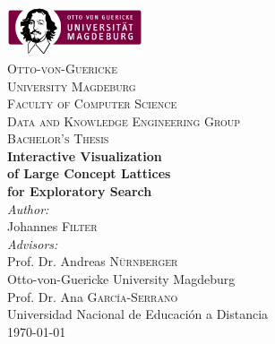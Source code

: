 \begin{titlepage}

\newcommand{\HRule}{\rule{\linewidth}{0.5mm}} %

\center %
 
\includegraphics[width=0.3\textwidth]{./images/logo}\\[0.3cm]

\textsc{\LARGE Otto-von-Guericke}\\[0.2cm] 
\textsc{\LARGE University Magdeburg}\\[0.3cm] 

\textsc{\large Faculty of Computer Science}\\[0.3cm]

\textsc{\normalsize Data and Knowledge Engineering Group}\\[1.5cm]

\textsc{\Large Bachelor's Thesis}\\[1.5cm] %

{ \huge \bfseries Interactive Visualization}\\[0.35cm]
{ \huge \bfseries of Large Concept Lattices}\\[0.2cm]
{ \huge \bfseries for Exploratory Search}\\[1.5cm]
 

\Large \emph{Author:}\\
Johannes \textsc{Filter}\\[0.5cm]

\Large \emph{Advisors:}\\
Prof. Dr. Andreas \textsc{Nürnberger}\\
{\small Otto-von-Guericke University Magdeburg}\\[0.5cm]

Prof. Dr. Ana \textsc{García-Serrano}\\
{\small Universidad Nacional de Educación a Distancia}\\[1.0cm]


{\large \today}

\vfill %

\end{titlepage}
